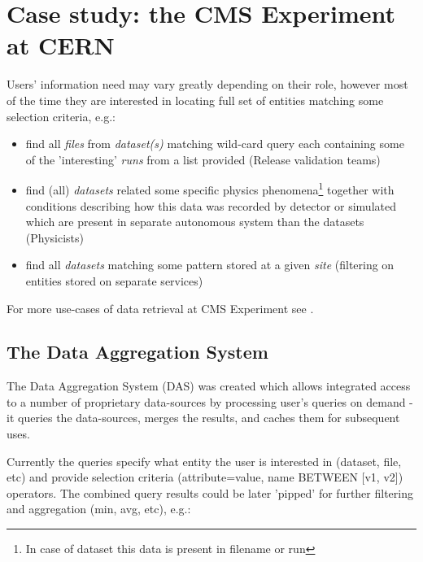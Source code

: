 \documentclass[a4paper,11pt,draft]{article}
\begin{document}
\section{Case study: the CMS Experiment at CERN}
Users' information need may vary greatly depending on their role, however most of the time they are interested in locating full set of entities matching some selection criteria, e.g.:
   \begin{itemize}
  		\item find all \textit{files} from \textit{dataset(s)} matching wild-card query each containing some of the 'interesting' \textit{runs} from a list provided (Release validation teams)
         \item find (all) \textit{datasets} related some specific physics phenomena\footnote{In case of dataset this data is present in filename or run} together with conditions describing how this data was recorded by detector or simulated which are present in separate autonomous system than the datasets (Physicists)
         \item find all \textit{datasets} matching some pattern stored at a given \textit{site} (filtering on entities stored on separate services)
   \end{itemize}                		

For more use-cases of data retrieval at CMS Experiment see \cite{CMS_data08}.


\subsection*{The Data Aggregation System}

The Data Aggregation System (DAS)\cite{Kuznetsov2010, Kuznetsov2011} was created which allows integrated access to a number of proprietary data-sources by processing user's queries on demand - it queries the data-sources, merges the results, and caches them for subsequent uses. 

Currently the queries specify what entity the user is interested in (dataset, file, etc) and provide selection criteria (attribute=value, name BETWEEN [v1, v2]) operators. The combined query results could be later 'pipped' for further filtering and aggregation (min, avg, etc), e.g.:
\end{document}
